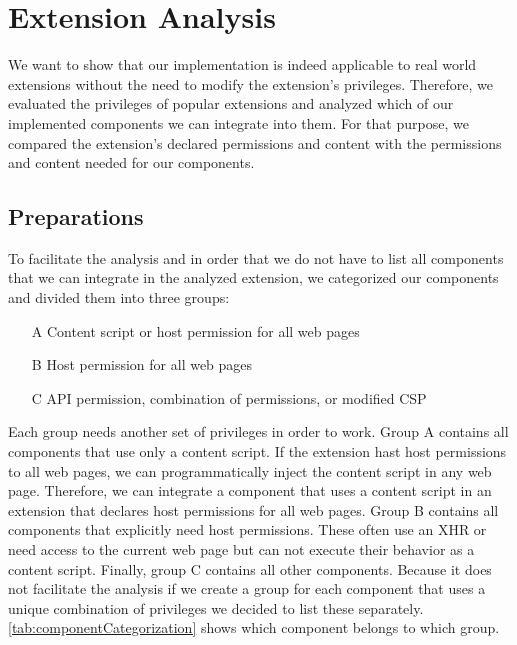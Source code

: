 
\chapter{Extension Analysis}
\label{chp:extensionAnalysis}
	
	We want to show that our implementation is indeed applicable to real world extensions without the need to modify the extension's privileges. Therefore, we evaluated the privileges of popular extensions and analyzed which of our implemented components we can integrate into them. For that purpose, we compared the extension's declared permissions and content with the permissions and content needed for our components. 
	
\section{Preparations}

	To facilitate the analysis and in order that we do not have to list all components that we can integrate in the analyzed extension, we categorized our components and divided them into three groups:

	\begin{itemize}[nosep]
		\item[A] Content script or host permission for all web pages
		\item[B] Host permission for all web pages
		\item[C] API permission, combination of permissions, or modified CSP
	\end{itemize}
	
	Each group needs another set of privileges in order to work. Group A contains all components that use only a content script. If the extension hast host permissions to all web pages, we can programmatically inject the content script in any web page. Therefore, we can integrate a component that uses a content script in an extension that declares host permissions for all web pages. Group B contains all components that explicitly need host permissions. These often use an XHR or need access to the current web page but can not execute their behavior as a content script. Finally, group C contains all other components. Because it does not facilitate the analysis if we create a group for each component that uses a unique combination of privileges we decided to list these separately. \autoref{tab:componentCategorization} shows which component belongs to which group. 
	
